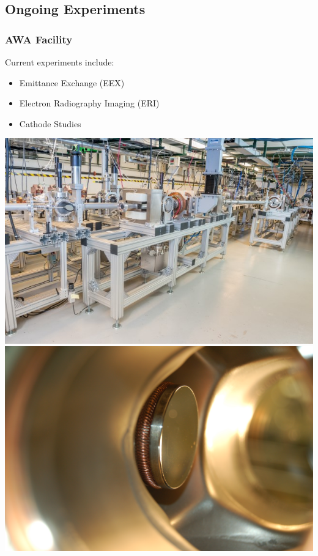 \documentclass[professionalfonts,t]{beamer}
\begin{document}
\subsection{Ongoing Experiments}
\begin{frame}
	\frametitle{AWA Facility}
	Current experiments include:
	\begin{itemize}
		\item{Emittance Exchange (EEX)}
		\item{Electron Radiography Imaging (ERI)}
		\item{Cathode Studies}
	\end{itemize}
	\vspace{0.3cm}
	\centering
	\includegraphics[width=0.5\linewidth]{../images/EEX}\includegraphics[width=0.5\linewidth]{../images/cathode1}
\end{frame}
\end{document}
